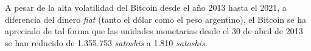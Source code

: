 A pesar de la alta volatilidad del Bitcoin desde el año 2013 hasta el 2021, a diferencia del dinero \textit{fiat} (tanto el dólar como el peso argentino), el Bitcoin se ha apreciado de tal forma que las unidades monetarias desde el 30 de abril de 2013 se han reducido de 1.355.753 \textit{satoshis} a 1.810 \textit{satoshis}.
